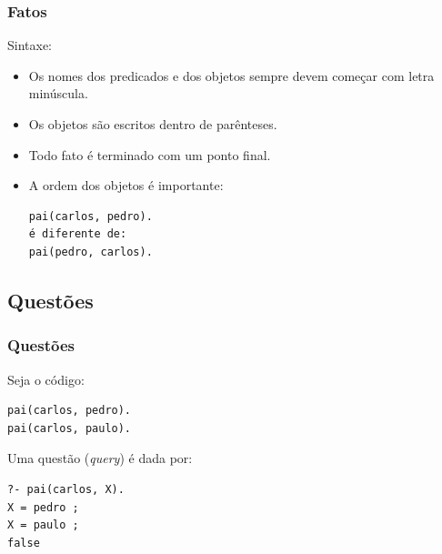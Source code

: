 \documentclass[sans]{beamer}
\begin{document}
\begin{frame}[fragile]   %
\frametitle{Fatos}
\begin{block}{Sintaxe:}
\begin{itemize} 

\item Os nomes dos predicados e dos objetos sempre devem começar com letra minúscula. 
\item Os objetos são escritos dentro de parênteses.
\item Todo fato é terminado com um ponto final.
\item A ordem dos objetos é importante:
\begin{verbatim}
pai(carlos, pedro). 
é diferente de:
pai(pedro, carlos).  
\end{verbatim}


\end{itemize} 
\end{block}
\end{frame}


\subsection{Questões} 
\begin{frame}[fragile]   %
\frametitle{Questões}
\begin{block}{Seja o código:}
\begin{verbatim}
pai(carlos, pedro). 
pai(carlos, paulo).  
\end{verbatim}
Uma questão (\textit{query}) é dada por:

\begin{verbatim}
?- pai(carlos, X). 
X = pedro ;
X = paulo ;
false
\end{verbatim}

\end{block}
\end{frame}

\end{document}
